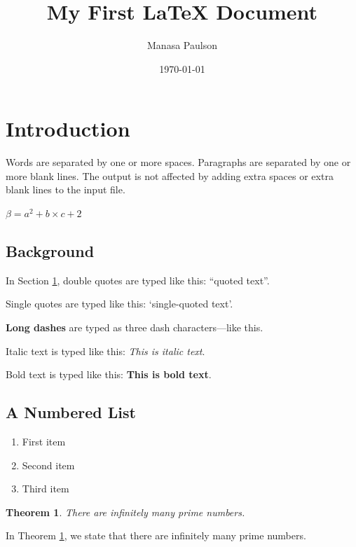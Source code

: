 \documentclass[a4paper,12pt]{article}
\newtheorem{theorem}{Theorem}[section]
\begin{document}
	
	\title{My First LaTeX Document}
	\author{Manasa Paulson}
	\date{\today}
	
	\maketitle
	
	\tableofcontents
	
	\newpage
	
	\section{Introduction}\label{intro}
	
	Words are separated by one or more spaces. Paragraphs are
	separated by one or more blank lines. The output is not affected
	by adding extra spaces or extra blank lines to the input file.
	
	{\large $\beta = a^2 + b\times c + 2$}
	
	\subsection{Background}
	
	In Section \ref{intro}, double quotes are typed like this:
	``quoted text''.
	
	Single quotes are typed like this: `single-quoted text'.
	
	\textbf{Long dashes} are typed as three dash characters---like this.
	
	Italic text is typed like this: \textit{This is italic text}.
	
	Bold text is typed like this: \textbf{This is bold text}.
	
	\subsection{A Numbered List}
	
	\begin{enumerate}
		\item First item
		\item Second item
		\item Third item
	\end{enumerate}
	
	\begin{theorem}\label{T1}
		There are infinitely many prime numbers.
	\end{theorem}
	
	In Theorem \ref{T1}, we state that there are infinitely many
	prime numbers.
	
\end{document}
